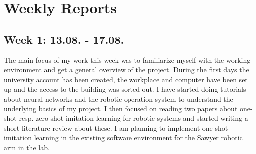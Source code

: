 \documentclass[12pt,oneside,a4paper]{article}
\begin{document}
\section{Weekly Reports}

\subsection{Week 1: 13.08. - 17.08.}
The main focus of my work this week was to familiarize myself with the working environment and get a general overview of the project. During the first days the university account has been created, the workplace and computer have been set up and the access to the building was sorted out. I have started doing tutorials about neural networks and the robotic operation system to understand the underlying basics of my project. I then focused on reading two papers about one-shot resp. zero-shot imitation learning for robotic systems and started writing a short literature review about these. I am planning to implement one-shot imitation learning in the existing software environment for the Sawyer robotic arm in the lab.
\end{document}

